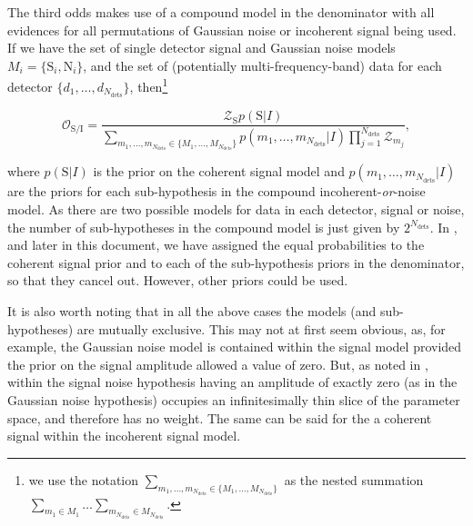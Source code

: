The third odds makes use of a compound model in the denominator with all evidences for all permutations of Gaussian noise or incoherent signal being used.
If we have the set of single detector signal and Gaussian noise models $M_i = \{\text{S}_i, \text{N}_i\}$, and the set of (potentially
multi-frequency-band) data for each detector $\{d_1, \ldots, d_{N_{\text{dets}}}\}$, then\footnote{we use the notation
$\sum_{m_1, \ldots, m_{N_{\text{dets}}}\in\{M_1, \ldots, M_{N_{\text{dets}}}\}}$ as the nested summation $\sum_{m_1 \in M_1}\ldots\sum_{m_{N_{\text{dets}}}\in M_{N_{\text{dets}}}}$.}
\begin{widetext}
\begin{equation}\label{eq:cohvincoh2}
 \mathcal{O}_{\text{S}/\text{I}} = \frac{\mathcal{Z}_{\text{S}}p(\text{S}|I)}{\sum_{m_1, \ldots, m_{N_{\text{dets}}}\in\{M_1, \ldots, M_{N_{\text{dets}}} \} } 
p(m_1,\ldots,m_{N_{\text{dets}}}|I)\prod_{j=1}^{N_{\text{dets}}} \mathcal{Z}_{m_j}},
\end{equation}
\end{widetext}
where $p(\text{S}|I)$ is the prior on the coherent signal model and $p(m_1,\ldots,m_{N_{\text{dets}}}|I)$ are the priors for each sub-hypothesis in the
compound incoherent-{\it or}-noise model. As there are two possible models for data in each detector, signal or noise, the number of sub-hypotheses
in the compound model is just given by $2^{N_{\text{dets}}}$. In \citet{2017arXiv170107709T}, and later in this 
document, we have assigned the equal probabilities to the coherent signal prior
and to each of the sub-hypothesis priors in the denominator, so that they cancel out. However, other priors could be used.

It is also worth noting that in all the above cases the models (and sub-hypotheses) are mutually exclusive. This may not at first seem obvious, as,
for example, the Gaussian noise model is contained within the signal model provided the prior on the signal amplitude allowed a value of zero. But, as noted in
\citet{2012PhRvD..85h2003L, MaxCWpolariations}, within the signal noise hypothesis having an amplitude of exactly zero (as in the Gaussian
noise hypothesis) occupies an infinitesimally thin slice of the parameter space, and therefore has no weight. The same can be said for the a coherent
signal within the incoherent signal model.
